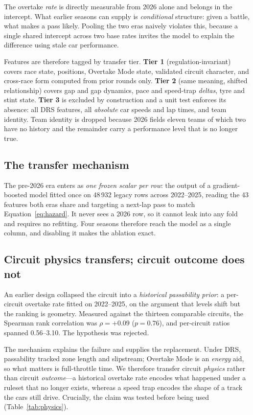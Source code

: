 \documentclass[11pt,a4paper]{article}
\begin{document}
The overtake \emph{rate} is directly measurable from 2026 alone and belongs in
the intercept. What earlier seasons can supply is \emph{conditional} structure:
given a battle, what makes a pass likely. Pooling the two eras naively violates
this, because a single shared intercept across two base rates invites the model
to explain the difference using stale car performance.

Features are therefore tagged by transfer tier. \textbf{Tier 1}
(regulation-invariant) covers race state, positions, Overtake Mode state,
validated circuit character, and cross-race form computed from prior rounds only.
\textbf{Tier 2} (same meaning, shifted relationship) covers gap and gap dynamics,
pace and speed-trap \emph{deltas}, tyre and stint state. \textbf{Tier 3} is
excluded by construction and a unit test enforces its absence: all DRS features,
all \emph{absolute} car speeds and lap times, and team identity. Team identity is
dropped because 2026 fields eleven teams of which two have no history and the
remainder carry a performance level that is no longer true.

\subsection{The transfer mechanism}

The pre-2026 era enters as \emph{one frozen scalar per row}: the output of a
gradient-boosted model \citep{ke2017lightgbm} fitted once on 48\,932 legacy
rows across 2022--2025, reading the 43 features both eras share
and targeting a next-lap pass to match Equation~\ref{eq:hazard}. It never sees a
2026 row, so it cannot leak into any fold and requires no refitting. Four seasons
therefore reach the model as a single column, and disabling it makes the ablation
exact.

\subsection{Circuit physics transfers; circuit outcome does not}
\label{sec:physics}

An earlier design collapsed the circuit into a \emph{historical passability
prior}: a per-circuit overtake rate fitted on 2022--2025, on the
argument that levels shift but the ranking is geometry. Measured against the
thirteen comparable circuits, the Spearman rank correlation was
$\rho = +0.09$ ($p = 0.76$), and per-circuit ratios spanned
0.56--3.10. The hypothesis was rejected.

The mechanism explains the failure and supplies the replacement. Under DRS,
passability tracked zone length and slipstream; Overtake Mode is an \emph{energy}
aid, so what matters is full-throttle time. We therefore transfer circuit
\emph{physics} rather than circuit \emph{outcome}---a historical overtake rate
encodes what happened under a ruleset that no longer exists, whereas a speed trap
encodes the shape of a track the cars still drive. Crucially, the claim was
tested before being used (Table~\ref{tab:physics}).
\end{document}
